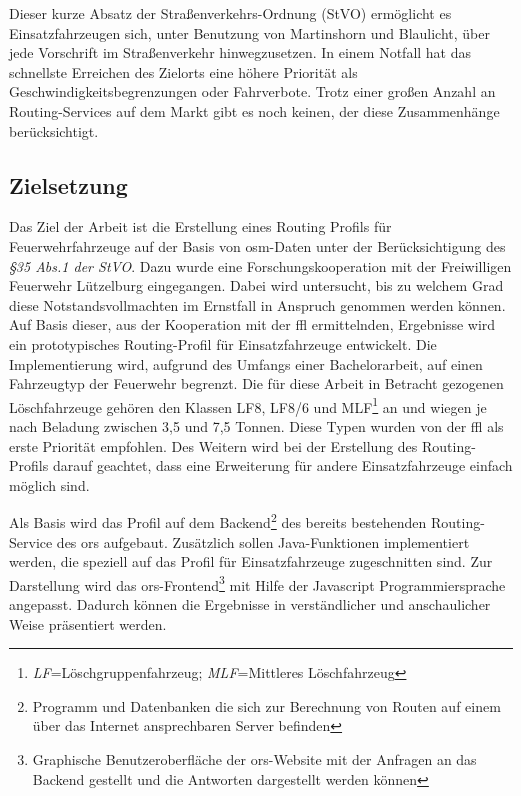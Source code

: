 \vspace{1.2cm}

Dieser kurze Absatz der Straßenverkehrs-Ordnung (StVO) ermöglicht es Einsatzfahrzeugen sich, unter Benutzung von Martinshorn und Blaulicht, über jede Vorschrift im Straßenverkehr hinwegzusetzen.
In einem Notfall hat das schnellste Erreichen des Zielorts eine höhere Priorität als Geschwindigkeitsbegrenzungen oder Fahrverbote.
Trotz einer großen Anzahl an Routing-Services auf dem Markt gibt es noch keinen, der diese Zusammenhänge berücksichtigt.

\subsection{Zielsetzung}
Das Ziel der Arbeit ist die Erstellung eines Routing Profils für Feuerwehrfahrzeuge auf der Basis von \gls{osm}-Daten unter der Berücksichtigung des \textit{§35 Abs.1 der StVO}. Dazu wurde eine Forschungskooperation mit der Freiwilligen Feuerwehr Lützelburg eingegangen. Dabei wird untersucht, bis zu welchem Grad diese Notstandsvollmachten im Ernstfall in Anspruch genommen werden können.
Auf Basis dieser, aus der Kooperation mit der \gls{ffl} ermittelnden, Ergebnisse wird ein prototypisches Routing-Profil für Einsatzfahrzeuge entwickelt.
Die Implementierung wird, aufgrund des Umfangs einer Bachelorarbeit, auf einen Fahrzeugtyp der Feuerwehr begrenzt.
Die für diese Arbeit in Betracht gezogenen Löschfahrzeuge gehören den Klassen LF8, LF8/6 und MLF\footnote{\textit{LF}=Löschgruppenfahrzeug; \textit{MLF}=Mittleres Löschfahrzeug} an und wiegen je nach Beladung zwischen 3,5 und 7,5 Tonnen.
Diese Typen wurden von der \gls{ffl} als erste Priorität empfohlen.
Des Weitern wird bei der Erstellung des Routing-Profils darauf geachtet, dass eine Erweiterung für andere Einsatzfahrzeuge einfach möglich sind.
\vspace{0.5cm}

Als Basis wird das Profil auf dem Backend\footnote{Programm und Datenbanken die sich zur Berechnung von Routen auf einem über das Internet ansprechbaren Server befinden} des bereits bestehenden Routing-Service des \gls{ors} aufgebaut.
Zusätzlich sollen Java-Funktionen implementiert werden, die speziell auf das Profil für Einsatzfahrzeuge zugeschnitten sind.
Zur Darstellung wird das \gls{ors}-Frontend\footnote{Graphische Benutzeroberfläche der \gls{ors}-Website mit der Anfragen an das Backend gestellt und die Antworten dargestellt werden können} mit Hilfe der Javascript Programmiersprache angepasst.
Dadurch können die Ergebnisse in verständlicher und anschaulicher Weise präsentiert werden.